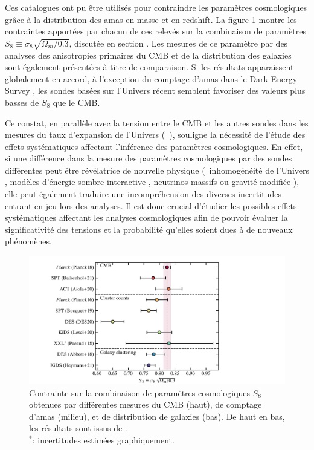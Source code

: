 Ces catalogues ont pu être utilisés pour contraindre les paramètres cosmologiques grâce à la distribution des amas en masse et en redshift.
La figure \ref{fig:cluster_S8} montre les contraintes apportées par chacun de ces relevés sur la combinaison de paramètres $S_8 \equiv \sigma_8 \sqrt{\Omega_m/0.3}$, discutée en section .
Les mesures de ce paramètre par des analyses des anisotropies primaires du CMB et de la distribution des galaxies sont également présentées à titre de comparaison.
Si les résultats apparaissent globalement en accord, à l'exception du comptage d'amas dans le Dark Energy Survey \cite{des_collaboration_dark_2020}, les sondes basées sur l'Univers récent semblent favoriser des valeurs plus basses de $S_8$ que le CMB.

Ce constat, en parallèle avec la tension entre le CMB et les autres sondes dans les mesures du taux d'expansion de l'Univers (\eg\ \cite{riess_large_2019,wong_h0licow_2020,efstathiou_h0_2021}), souligne la nécessité de l'étude des effets systématiques affectant l'inférence des paramètres cosmologiques.
En effet, si une différence dans la mesure des paramètres cosmologiques par des sondes différentes peut être révélatrice de nouvelle physique (\eg\ inhomogénéité de l'Univers \cite{bohringer_observational_2020}, modèles d'énergie sombre interactive \cite{di_valentino_interacting_2020}, neutrinos massifs \cite{bolliet_including_2020} ou gravité modifiée \cite{cataneo_tests_2018}), elle peut également traduire une incompréhension des diverses incertitudes entrant en jeu lors des analyses.
Il est donc crucial d'étudier les possibles effets systématiques affectant les analyses cosmologiques afin de pouvoir évaluer la significativité des tensions et la probabilité qu'elles soient dues à de nouveaux phénomènes.

\begin{figure}[t]
    \centering
    \includegraphics[width=.9\linewidth]{Figures/Chap_amas/S8.pdf}
    \caption{
        Contrainte sur la combinaison de paramètres cosmologiques $S_8$ obtenues par différentes mesures du CMB (haut), de comptage d'amas (milieu), et de distribution de galaxies (bas).
        De haut en bas, les résultats sont issus de \cite{planck_collaboration_planck_2020}\cite{balkenhol_constraints_2021}\cite{aiola_atacama_2020}\cite{planck_collaboration_planck_2016-1}\cite{bocquet_cluster_2019}\cite{des_collaboration_dark_2020}\cite{lesci_amico_2020}\cite{pacaud_xxl_2018}\cite{abbott_dark_2018}\cite{heymans_kids-1000_2021}. \\
        $^*$: incertitudes estimées graphiquement.
    }
    \label{fig:cluster_S8}
\end{figure}

